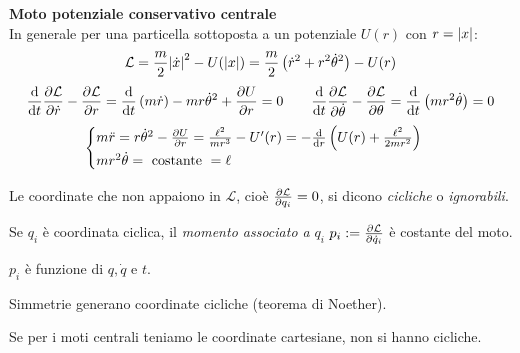 \begin{example}
    \textbf{Moto potenziale conservativo centrale}\\
    In generale per una particella sottoposta a un potenziale $U(r )$ con $r = \abs{x}$:
    \begin{equation}
        \mathcal{L}= \frac{m}{2}\abs{\dot{x}}^2 -U(\abs{x}) = \frac{m}{2}\left( \dot{r}^2+r^2\dot{\theta}^2 \right)-U(r)
    \end{equation}
    \begin{equation}
        \dv{t}\pdv{\mathcal{L}}{\dot{r}}-\pdv{\mathcal{L}}{r}= \dv{t}\left( m\dot{r} \right) - mr\dot{\theta}^2 + \pdv{U}{r}=0\qquad 
        \dv{t}\pdv{\mathcal{L}}{\dot{\theta}}-\pdv{\mathcal{L}}{\theta}= \dv{t}\left( mr^2\dot{\theta} \right)=0
    \end{equation}
    \begin{equation}
        \begin{cases}
            m\ddot{r}= r\dot{\theta}^2-\pdv{U}{r}= \frac{\ell^2}{mr^3}-U'(r)= -\dv{r}\left( U(r) + \frac{\ell^2}{2mr^2} \right)\\
            mr^2\dot{\theta}= \text{ costante }= \ell
        \end{cases}
    \end{equation}
\end{example}

\begin{definition}
    Le coordinate che non appaiono in $\mathcal{L}$, cioè $\pdv{\mathcal{L}}{q_i}=0$, si dicono \textit{cicliche} o \textit{ignorabili}.
\end{definition}
\begin{proposition}
    Se $q_i $ è coordinata ciclica, il \textit{momento associato a }$q_i $ $p_i:=\pdv{\mathcal{L}}{\dot{q}_i}$ è costante del moto.
\end{proposition}
\begin{remark}
    $p_i$ è funzione di $q,\dot{q}$ e $t$.
\end{remark}
\begin{remark}
    Simmetrie generano coordinate cicliche (teorema di Noether).
\end{remark}

\begin{example}
    Se per i moti centrali teniamo le coordinate cartesiane, non si hanno cicliche.
\end{example}


